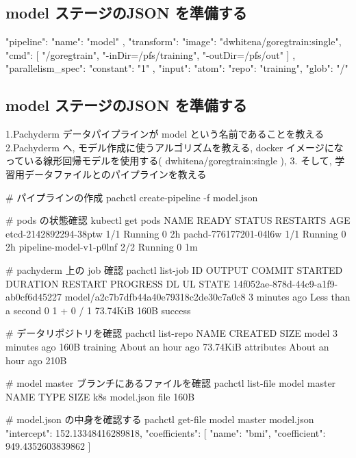 \documentclass[mingoth,a4paper]{jsarticle}
\begin{document}
\subsection{model ステージのJSON を準備する}

\begin{commandline}
{
  "pipeline": {
    "name": "model"
  },
  "transform": {
    "image": "dwhitena/goregtrain:single",
    "cmd": [
      "/goregtrain",
      "-inDir=/pfs/training",
      "-outDir=/pfs/out"
    ]
  },
  "parallelism_spec": {
    "constant": "1"
  },
  "input": {
    "atom": {
      "repo": "training",
      "glob": "/"
    }
  }
}
\end{commandline}

\subsection{model ステージのJSON を準備する}

1.Pachyderm データパイプラインが model という名前であることを教える
2.Pachyderm へ, モデル作成に使うアルゴリズムを教える, docker イメージになっている線形回帰モデルを使用する( dwhitena/goregtrain:single ), 
3. そして, 学習用データファイルとのパイプラインを教える

\begin{commandline}
# パイプラインの作成
pachctl create-pipeline -f model.json

# pods の状態確認
kubectl get pods
NAME READY STATUS RESTARTS AGE
etcd-2142892294-38ptw 1/1 Running 0 2h
pachd-776177201-04l6w 1/1 Running 0 2h
pipeline-model-v1-p0lnf 2/2 Running 0 1m

# pachyderm 上の job 確認
pachctl list-job
ID OUTPUT COMMIT STARTED DURATION RESTART PROGRESS DL UL STATE
14f052ae-878d-44c9-a1f9-ab0cf6d45227 model/a2c7b7dfb44a40e79318c2de30c7a0c8
3 minutes ago Less than a second 0 1 + 0 / 1 73.74KiB 160B success

# データリポジトリを確認
pachctl list-repo
NAME CREATED SIZE
model 3 minutes ago 160B
training About an hour ago 73.74KiB
attributes About an hour ago 210B

# model master ブランチにあるファイルを確認
pachctl list-file model master
NAME TYPE SIZE k8s
model.json file 160B

# model.json の中身を確認する
pachctl get-file model master model.json
{
  "intercept": 152.13348416289818,
  "coefficients": [
    {
      "name": "bmi",
      "coefficient": 949.4352603839862
    }
  ]
}
\end{commandline}
\end{document}
